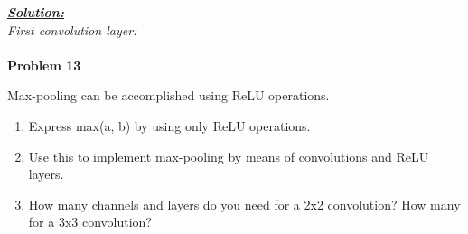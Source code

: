 \documentclass{article}
\begin{document}
\noindent \underline{\textbf{\textit{Solution:}}} \\ 

\noindent \textit{First convolution layer:} \\ \\




\newpage
\noindent \textbf{Problem 13}

\noindent Max-pooling can be accomplished using ReLU operations.
\begin{enumerate} [label=\Alph*]
    
    \item Express max(a, b) by using only ReLU operations.
    \item Use this to implement max-pooling by means of convolutions and ReLU layers.
    \item How many channels and layers do you need for a 2x2 convolution? How many for a 3x3 convolution?\\ \\ \\
\end{enumerate}\
\end{document}
